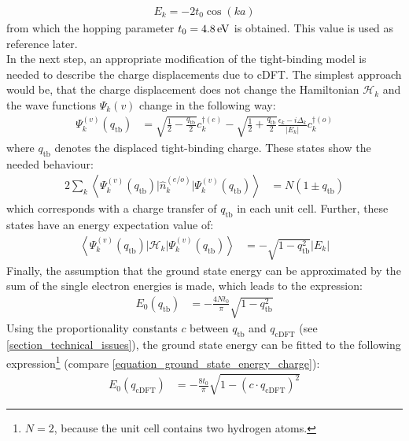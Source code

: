 \begin{align}
	E_k = -2t_0\cos(ka)
\end{align}
from which the hopping parameter $t_0 = \unit[4.8]{eV}$ is obtained. This value is used as reference later.\\
In the next step, an appropriate modification of the tight-binding model is needed to describe the charge displacements due to cDFT. The simplest approach would be, that the charge displacement does not change the Hamiltonian $\mathcal{H}_k$ and the wave functions $\Psi_k{(v)}$ change in the following way:
\begin{align}
\Psi_k^{(v)}(q_\text{tb}) &= \sqrt{\frac{1}{2}-\frac{q_\text{tb}}{2}}c_k^{\dagger(e)}- \sqrt{\frac{1}{2}+\frac{q_\text{tb}}{2}}\frac{\epsilon_k - i \Delta_k}{|E_k|}c_{k}^{\dagger(o)}
\end{align}
where $q_\text{tb}$ denotes the displaced tight-binding charge. These states show the needed behaviour:
\begin{align}
	2\sum_k\left\langle\Psi_k^{(v)}(q_\text{tb})\Big|\hat{n}_k^{(e/o)}\Big|\Psi_k^{(v)}(q_\text{tb})\right\rangle &= N \left(1 \pm q_\text{tb}\right)
\end{align}
which corresponds with a charge transfer of $q_\text{tb}$ in each unit cell. Further, these states have an energy expectation value of:
\begin{align}
\left\langle\Psi_k^{(v)}(q_\text{tb})\Big|\mathcal{H}_{k}\Big|\Psi_k^{(v)}(q_\text{tb})\right\rangle &= -\sqrt{1-q^2_\text{tb}} |E_k|
\label{equation_method_1_energies}
\end{align}
Finally, the assumption that the ground state energy can be approximated by the sum of the single electron energies is made, which leads to the expression:
\begin{align}
E_0(q_\text{tb}) &= -\frac{4Nt_0}{\pi} \sqrt{1-q^2_\text{tb}}
\label{equation_ground_state_energy_charge}
\end{align}
Using the proportionality constants $c$ between $q_\text{tb}$ and $q_\text{cDFT}$ (see \cref{section_technical_issues}), the ground state energy can be fitted to the following expression\footnote{$N=2$, because the unit cell contains two hydrogen atoms.} (compare \cref{equation_ground_state_energy_charge}):
\begin{align}
	E_0(q_\text{cDFT}) &= -\frac{8t_0}{\pi} \sqrt{1 - \left(c\cdot q_\text{cDFT}\right)^2}
	\label{equation_42}
\end{align}
